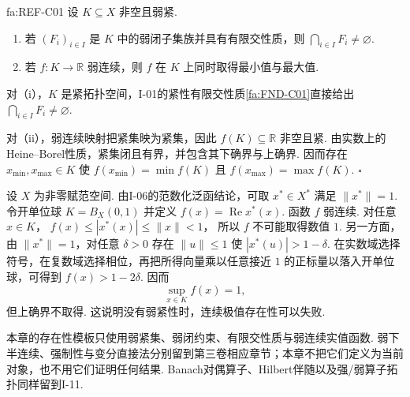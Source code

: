 \begin{FAProposition}[C][弱紧性的纯拓扑存在性模板]{fa:REF-C01}
设 \(\displaystyle K\subseteq X\) 非空且弱紧.
\begin{enumerate}[label=\textnormal{(\roman*)}]
\item 若 \(\displaystyle (F_i)_{i\in I}\) 是 \(\displaystyle K\) 中的弱闭子集族并具有有限交性质，则 \(\displaystyle \bigcap_{i\in I}F_i\neq\varnothing\).
\item 若 \(\displaystyle f:K\to\mathbb R\) 弱连续，则 \(\displaystyle f\) 在 \(\displaystyle K\) 上同时取得最小值与最大值.
\end{enumerate}
\end{FAProposition}

\begin{FAProof}
对（i），\(\displaystyle K\) 是紧拓扑空间，I-01的紧性有限交性质\autoref{fa:FND-C01}直接给出 \(\displaystyle \bigcap_{i\in I}F_i\neq\varnothing\).

对（ii），弱连续映射把紧集映为紧集，因此 \(\displaystyle f(K)\subseteq\mathbb R\) 非空且紧. 由实数上的Heine--Borel性质，紧集闭且有界，并包含其下确界与上确界. 因而存在 \(\displaystyle x_{\min},x_{\max}\in K\) 使 \(\displaystyle f(x_{\min})=\min f(K)\) 且 \(\displaystyle f(x_{\max})=\max f(K)\).
\hfill\(\square\)
\end{FAProof}

\begin{FACounterexample}[缺少紧性时弱连续函数可不取上确界]
设 \(\displaystyle X\) 为非零赋范空间. 由I-06的范数化泛函结论，可取 \(\displaystyle x^*\in X^*\) 满足 \(\displaystyle \|x^*\|=1\). 令开单位球
\(\displaystyle K=B_X(0,1)\)
并定义
\(\displaystyle f(x)=\operatorname{Re}x^*(x)\).
函数 \(\displaystyle f\) 弱连续. 对任意 \(\displaystyle x\in K\)，
\(\displaystyle f(x)\leqslant|x^*(x)|\leqslant\|x\|<1\)，
所以 \(\displaystyle f\) 不可能取得数值 \(\displaystyle1\). 另一方面，由 \(\displaystyle \|x^*\|=1\)，对任意 \(\displaystyle \delta>0\) 存在 \(\displaystyle \|u\|\leqslant1\) 使 \(\displaystyle |x^*(u)|>1-\delta\). 在实数域选择符号，在复数域选择相位，再把所得向量乘以任意接近 \(\displaystyle1\) 的正标量以落入开单位球，可得到 \(\displaystyle f(x)>1-2\delta\). 因而
\[
\sup_{x\in K}f(x)=1,
\]
但上确界不取得. 这说明没有弱紧性时，连续极值存在性可以失败.
\end{FACounterexample}

\begin{FAWarning}[后续变分理论边界]
本章的存在性模板只使用弱紧集、弱闭约束、有限交性质与弱连续实值函数. 弱下半连续、强制性与变分直接法分别留到第三卷相应章节；本章不把它们定义为当前对象，也不用它们证明任何结果. Banach对偶算子、Hilbert伴随以及强/弱算子拓扑同样留到I-11.
\end{FAWarning}

